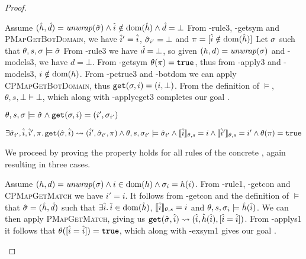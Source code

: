 \begin{proof}

\begin{hypvlist}
 Assume $(\hat{h},\hat{d})=\operatorname{\mathit{unwrap}}(\hat{\sigma}) \land \hat{i}\notin \operatorname{dom}(\hat{h}) \land \hat{d}=\bot$
 From \hyp{rule3}, \hyp{getsym} and \textsc{PMapGetBotDomain}, we have $\hat{i}'=\hat{i}$, $\hat{\sigma}_{i'}=\bot$ and ${\pi=[\hat{i}\notin \operatorname{dom}(\hat{h})]}$
 Let $\sigma$ such that $\theta,s,\sigma\models\hat{\sigma}$
 From \hyp{rule3} we have $\hat{d}=\bot$, so given $(h,d)=\operatorname{\mathit{unwrap}}(\sigma)$ and \hyp{models3}, we have $d=\bot$.%
 From \hyp{getsym} $\theta(\pi)=\texttt{true}$, thus from \hyp{apply3} and \hyp{models3}, $i\notin \operatorname{dom}(h)$.
 From \hyp{pctrue3} and \hyp{botdom} we can apply \textsc{CPMapGetBotDomain}, thus ${\texttt{get}(\sigma,i)=(i,\bot)}$.
 From the definition of $\models$, $\theta,s,\bot\models\bot$, which along with \hyp{applycget3} completes our goal .
\end{hypvlist}


\pfassume \begin{hypvlist}
 $\theta,s,\sigma \models \hat{\sigma} \land \texttt{get}(\sigma, i)=(i', \sigma_{i'})$
\end{hypvlist}
\pfprove \begin{goalvlist}
 $\exists \hat{\sigma}_{i'}, \hat{i}, \hat{i}', \pi \ldotp \texttt{get}(\hat{\sigma},\hat{i})\rightsquigarrow(\hat{i}', \hat{\sigma}_{i'}, \pi) \land \theta,s,\sigma_{i'}\models\hat{\sigma}_{i'} \land \llbracket\hat{i}\rrbracket_{\theta,s}=i \land \llbracket\hat{i}'\rrbracket_{\theta,s}=i' \land \theta(\pi)=\texttt{true}$
\end{goalvlist}

We proceed by proving the property holds for all rules of the concrete , again resulting in three cases.


\begin{hypvlist}
 Assume $(h,d)=\operatorname{\mathit{unwrap}}(\sigma) \land i\in\operatorname{dom}(h) \land \sigma_{i}=h(i)$.
 From \hyp{rule1}, \hyp{getcon} and \textsc{CPMapGetMatch} we have $i'=i$.
 It follows from \hyp{getcon} and the definition of $\models$ that $\hat{\sigma}=(\hat{h}, \hat{d})$ such that $\exists \hat{i}\ldotp \hat{i} \in \operatorname{dom}(\hat{h})$, $\llbracket\hat{i}\rrbracket_{\theta,s}=i$ and $\theta,s,\sigma_i\models \hat{h}(\hat{i})$.
 We can then apply \textsc{PMapGetMatch}, giving us $\texttt{get}(\hat{\sigma},\hat{i})\rightsquigarrow(\hat{i}, \hat{h}(\hat{i}), [\hat{i} = \hat{i}])$.
 From \hyp{applys1} it follows that $\theta([\hat{i}=\hat{i}])=\texttt{true}$, which along with \hyp{exsym1} gives our goal .
\end{hypvlist}


\end{proof}
